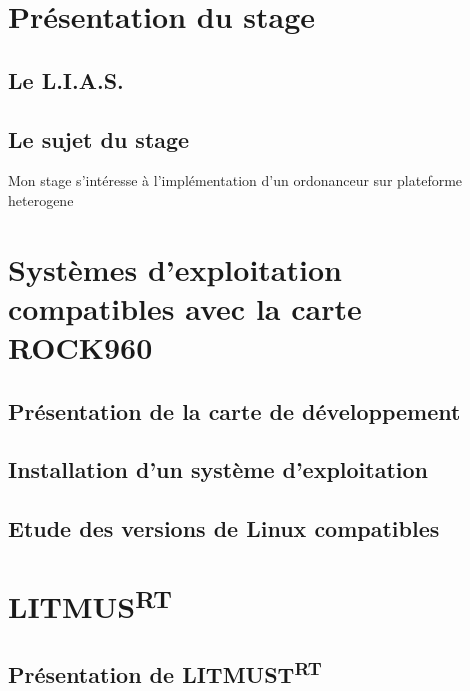 \documentclass{article}
\begin{document}
    
    \section*{Présentation du stage}
    
    
    \subsection{Le L.I.A.S.}
    \subsection{Le sujet du stage}
    
    Mon stage s'intéresse à l'implémentation d'un ordonanceur sur \gls{plateforme heterogene}\cite{bertout2020workload}

    \newpage
    \section{Systèmes d'exploitation compatibles avec la carte ROCK960}
    \subsection{Présentation de la carte de développement}

    \subsection{Installation d'un système d'exploitation}
    

    \subsection{Etude des versions de Linux compatibles}
    

    


    
    \newpage
    \section{LITMUS\textsuperscript{RT}}
    
    \subsection{Présentation de LITMUST\textsuperscript{RT}}
    
\end{document}

